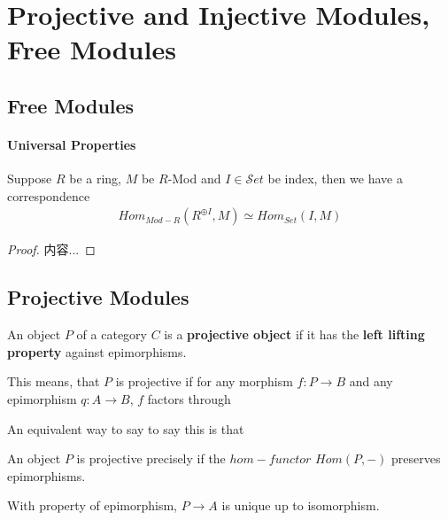 \documentclass[Total.tex]{subfiles}
\begin{document}
	\tableofcontents
	\chapter{Projective and Injective Modules, Free Modules}
		\section{Free Modules}
			\begin{Def}
				
			\end{Def}
			\subsubsection{Universal Properties}
			\begin{proposition}
				Suppose $R$ be a ring, $M$ be $R$-Mod and $I\in {\mathcal Set}$ be index, then we have a correspondence
				\begin{gather*}
					Hom_{Mod-R}(R^{\oplus I},M)\simeq Hom_{Set}(I,M)
				\end{gather*} 
			\end{proposition}
			\begin{proof}
				内容...
			\end{proof}
		\section{Projective Modules}
			\begin{Def}
				An object $P$ of a category $C$ is a \textbf{projective object} if it has the \textbf{left lifting property} against epimorphisms. 
				
				This means, that $P$ is projective if for any morphism $f:P\rightarrow B$ and any epimorphism $q:A\rightarrow B$, $f$ factors through
				\begin{center}
				\end{center}
			\end{Def}
			An equivalent way to say to say this is that
			\begin{Def}
				An object $P$ is projective precisely if the $hom-functor$ $Hom(P,-)$ preserves epimorphisms.
			\end{Def}
			
			With property of epimorphism, $P\rightarrow A$ is unique up to isomorphism.
			
\end{document}
